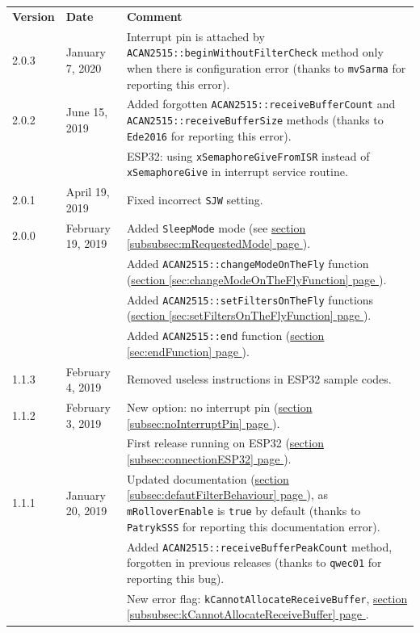 \documentclass[9pt, a4paper, obeyspaces]{extarticle}
\newcommand\refSectionPage[1]{\hyperref[sec:#1]{section \ref*{sec:#1} page \pageref{sec:#1}}}
\newcommand\refSubsectionPage[1]{\hyperref[subsec:#1]{section \ref*{subsec:#1} page \pageref{subsec:#1}}}
\newcommand\refSubsubsectionPage[1]{\hyperref[subsubsec:#1]{section \ref*{subsubsec:#1} page \pageref{subsubsec:#1}}}
\begin{document}
\begin{center}
  \small
  \begin{tabular}{llp{11cm}}
    \textbf{Version} & \textbf{Date} & \textbf{Comment}\\
    2.0.3 & January 7, 2020 & Interrupt pin is attached by \texttt{ACAN2515::beginWithoutFilterCheck} method only when there is configuration error (thanks to \texttt{mvSarma} for reporting this error). \\
    2.0.2 & June 15, 2019 & Added forgotten \texttt{ACAN2515::receiveBufferCount} and \texttt{ACAN2515::receiveBufferSize} methods (thanks to \texttt{Ede2016} for reporting this error). \\
          &               & ESP32: using \texttt{xSemaphoreGiveFromISR} instead of \texttt{xSemaphoreGive} in interrupt service routine. \\
    2.0.1 & April 19, 2019 & Fixed incorrect \texttt{SJW} setting. \\
    2.0.0 & February 19, 2019 & Added \texttt{SleepMode} mode (see \refSubsubsectionPage{mRequestedMode}). \\
          &                   & Added \texttt{ACAN2515::changeModeOnTheFly} function (\refSectionPage{changeModeOnTheFlyFunction}). \\
          &                   & Added \texttt{ACAN2515::setFiltersOnTheFly} functions (\refSectionPage{setFiltersOnTheFlyFunction}). \\
          &                   & Added \texttt{ACAN2515::end} function (\refSectionPage{endFunction}). \\
    1.1.3 & February 4, 2019 & Removed useless instructions in ESP32 sample codes. \\
    1.1.2 & February 3, 2019 & New option: no interrupt pin (\refSubsectionPage{noInterruptPin}). \\
          &                  & First release running on ESP32 (\refSubsectionPage{connectionESP32}). \\
    1.1.1 & January 20, 2019 & Updated documentation (\refSubsectionPage{defautFilterBehaviour}), as \texttt{mRolloverEnable} is \texttt{true} by default (thanks to \texttt{PatrykSSS} for reporting this documentation error).\\
          &                   & Added \texttt{ACAN2515::receiveBufferPeakCount} method, forgotten in previous releases (thanks to \texttt{qwec01} for reporting this bug).\\
          &                   & New error flag: \texttt{kCannotAllocateReceiveBuffer}, \refSubsubsectionPage{kCannotAllocateReceiveBuffer}.\\

\end{tabular}
\end{center}
\end{document}
